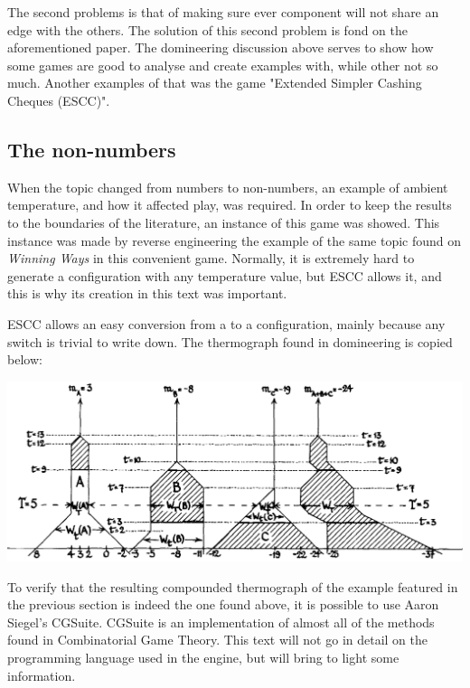The second problems is that of making sure ever component will not share an edge with the others. The solution of this second problem is fond on the aforementioned paper. The domineering discussion above serves to show how some games are good to analyse and create examples with, while other not so much. Another examples of that was the game "Extended Simpler Cashing Cheques (ESCC)". 

\subsection*{The non-numbers}

When the topic changed from numbers to non-numbers, an example of ambient temperature, and how it affected play, was required. In order to keep the results to the boundaries of the literature, an instance of this game was showed. This instance was made by reverse engineering the example of the same topic found on \textit{Winning Ways} \cite{WW} in this convenient game. Normally, it is extremely hard to generate a configuration with any temperature value, but ESCC allows it, and this is why its creation in this text was important.

ESCC allows an easy conversion from a  to a configuration, mainly because any switch is trivial to write down. The thermograph found in domineering is copied below:

\vspace{0.5cm}\hspace{-3cm}\includegraphics[scale=0.5]{../images/cpd_therm_ww.png}
\vspace{0.5cm}

To verify that the resulting compounded thermograph of the example featured in the previous section is indeed the one found above, it is possible to use Aaron Siegel's CGSuite. CGSuite is an implementation of almost all of the methods found in Combinatorial Game Theory. This text will not go in detail on the programming language used in the engine, but will bring to light some information.

